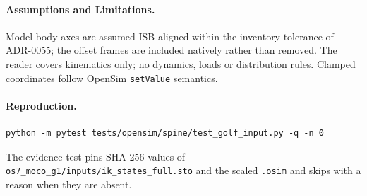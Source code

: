 \paragraph{Assumptions and Limitations.}
Model body axes are assumed ISB-aligned within the inventory tolerance of
ADR-0055; the offset frames are included natively rather than removed. The
reader covers kinematics only; no dynamics, loads or distribution rules.
Clamped coordinates follow OpenSim \texttt{setValue} semantics.

\paragraph{Reproduction.}
\begin{verbatim}
python -m pytest tests/opensim/spine/test_golf_input.py -q -n 0
\end{verbatim}
The evidence test pins SHA-256 values of
\texttt{os7\_moco\_g1/inputs/ik\_states\_full.sto} and the scaled
\texttt{.osim} and skips with a reason when they are absent.
